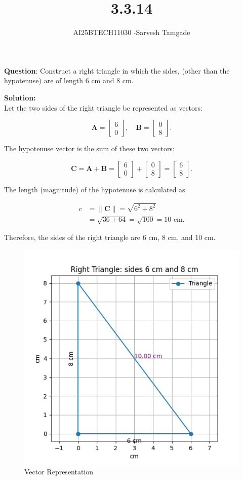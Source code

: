 \documentclass[journal]{IEEEtran}
\begin{document}

\vspace{3cm}

\title{3.3.14}
\author{AI25BTECH11030 -Sarvesh Tamgade}
{\let\newpage\relax\maketitle}

\renewcommand{\thefigure}{\theenumi}
\renewcommand{\thetable}{\theenumi}
\setlength{\intextsep}{10pt} 


\renewcommand{\thetable}{\theenumi}


\textbf{Question}: Construct a right triangle in which the sides, (other than the hypotenuse) are of length 6 cm and 8 cm.

\textbf{Solution:}\\
Let the two sides of the right triangle be represented as vectors:

\[
\mathbf{A} = \begin{bmatrix} 6 \\ 0 \end{bmatrix}, \quad
\mathbf{B} = \begin{bmatrix} 0 \\ 8 \end{bmatrix}.
\]

The hypotenuse vector is the sum of these two vectors:

\[
\mathbf{C} = \mathbf{A} + \mathbf{B} = \begin{bmatrix} 6 \\ 0 \end{bmatrix} + \begin{bmatrix} 0 \\ 8 \end{bmatrix} = \begin{bmatrix} 6 \\ 8 \end{bmatrix}.
\]

The length (magnitude) of the hypotenuse is calculated as

\begin{align*}
c &= \| \mathbf{C} \| = \sqrt{6^2 + 8^2} \\
  &= \sqrt{36 + 64} = \sqrt{100} = 10 \text{ cm}.
\end{align*}

Therefore, the sides of the right triangle are 6 cm, 8 cm, and 10 cm.

\begin{figure}[htbp]
    \centering
    \includegraphics[width=0.65\linewidth]{FIG/fig1.png}
    \caption{Vector Representation}
    \label{fig:FIG/fig1.png}
    \end{figure}
\end{document}
